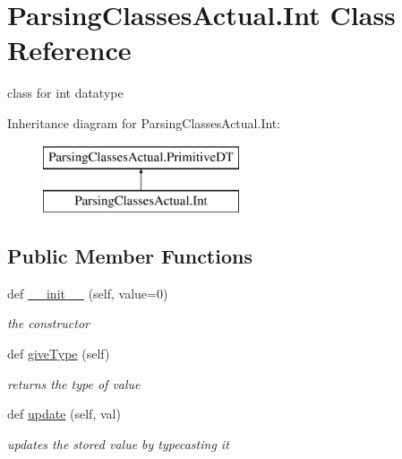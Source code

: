 \hypertarget{class_parsing_classes_actual_1_1_int}{}\section{Parsing\+Classes\+Actual.\+Int Class Reference}
\label{class_parsing_classes_actual_1_1_int}


class for int datatype  


Inheritance diagram for Parsing\+Classes\+Actual.\+Int\+:\begin{figure}[H]
\begin{center}
\leavevmode
\includegraphics[height=2.000000cm]{class_parsing_classes_actual_1_1_int}
\end{center}
\end{figure}
\subsection*{Public Member Functions}
\begin{DoxyCompactItemize}
\item 
def \hyperlink{class_parsing_classes_actual_1_1_int_a138d3ed5b3b5bcc5f3aeeef5716a1c42}{\+\_\+\+\_\+init\+\_\+\+\_\+} (self, value=0)
\begin{DoxyCompactList}\small\item\em the constructor \end{DoxyCompactList}\item 
def \hyperlink{class_parsing_classes_actual_1_1_int_a6430fbdf4a89ea8c64b08c5d69c3ac1a}{give\+Type} (self)\hypertarget{class_parsing_classes_actual_1_1_int_a6430fbdf4a89ea8c64b08c5d69c3ac1a}{}\label{class_parsing_classes_actual_1_1_int_a6430fbdf4a89ea8c64b08c5d69c3ac1a}

\begin{DoxyCompactList}\small\item\em returns the type of value \end{DoxyCompactList}\item 
def \hyperlink{class_parsing_classes_actual_1_1_int_a9dd15ae2f1ef3e3452d307013b439744}{update} (self, val)\hypertarget{class_parsing_classes_actual_1_1_int_a9dd15ae2f1ef3e3452d307013b439744}{}\label{class_parsing_classes_actual_1_1_int_a9dd15ae2f1ef3e3452d307013b439744}

\begin{DoxyCompactList}\small\item\em updates the stored value by typecasting it \end{DoxyCompactList}\end{DoxyCompactItemize}
